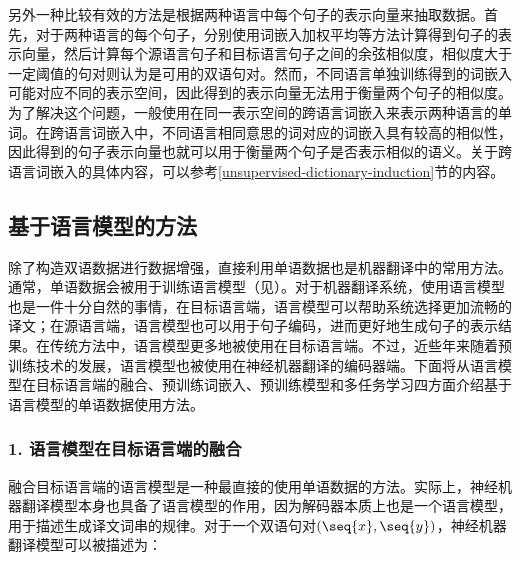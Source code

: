 \parinterval 另外一种比较有效的方法是根据两种语言中每个句子的表示向量来抽取数据。首先，对于两种语言的每个句子，分别使用词嵌入加权平均等方法计算得到句子的表示向量，然后计算每个源语言句子和目标语言句子之间的余弦相似度，相似度大于一定阈值的句对则认为是可用的双语句对。然而，不同语言单独训练得到的词嵌入可能对应不同的表示空间，因此得到的表示向量无法用于衡量两个句子的相似度。为了解决这个问题，一般使用在同一表示空间的跨语言词嵌入来表示两种语言的单词。在跨语言词嵌入中，不同语言相同意思的词对应的词嵌入具有较高的相似性，因此得到的句子表示向量也就可以用于衡量两个句子是否表示相似的语义。关于跨语言词嵌入的具体内容，可以参考\ref{unsupervised-dictionary-induction}节的内容。

\subsection{基于语言模型的方法}

\parinterval 除了构造双语数据进行数据增强，直接利用单语数据也是机器翻译中的常用方法。通常，单语数据会被用于训练语言模型（见{\chaptertwo}）。对于机器翻译系统，使用语言模型也是一件十分自然的事情，在目标语言端，语言模型可以帮助系统选择更加流畅的译文；在源语言端，语言模型也可以用于句子编码，进而更好地生成句子的表示结果。在传统方法中，语言模型更多地被使用在目标语言端。不过，近些年来随着预训练技术的发展，语言模型也被使用在神经机器翻译的编码器端。下面将从语言模型在目标语言端的融合、预训练词嵌入、预训练模型和多任务学习四方面介绍基于语言模型的单语数据使用方法。

\subsubsection{1. 语言模型在目标语言端的融合}

\parinterval 融合目标语言端的语言模型是一种最直接的使用单语数据的方法。实际上，神经机器翻译模型本身也具备了语言模型的作用，因为解码器本质上也是一个语言模型，用于描述生成译文词串的规律。对于一个双语句对$(\seq{x}, \seq{y})$，神经机器翻译模型可以被描述为：

